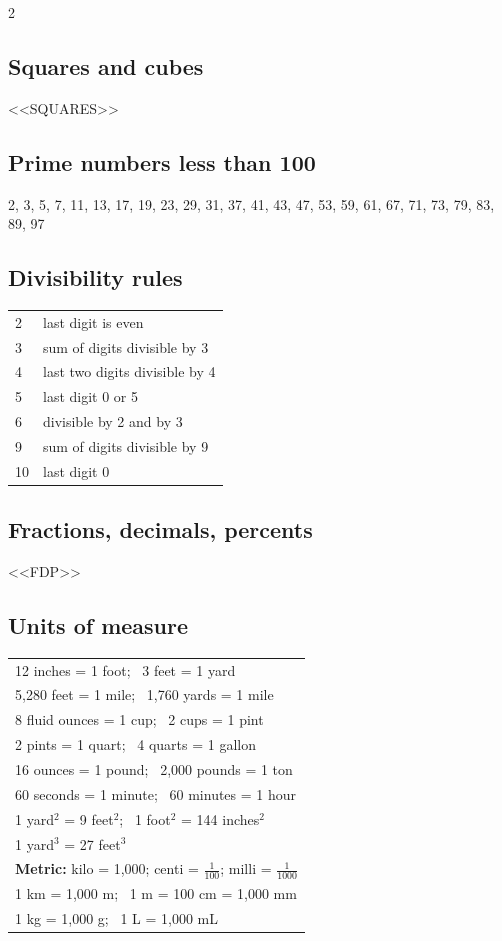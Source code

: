 \begin{multicols}{2}
\subsection*{Squares and cubes}
\begin{center}\small\renewcommand{\arraystretch}{1.1}
<<SQUARES>>
\end{center}

\subsection*{Prime numbers less than 100}
2, 3, 5, 7, 11, 13, 17, 19, 23, 29, 31, 37, 41, 43, 47, 53, 59, 61, 67, 71,
73, 79, 83, 89, 97

\subsection*{Divisibility rules}
\begin{tabular}{@{}ll@{}}
2 & last digit is even\\
3 & sum of digits divisible by 3\\
4 & last two digits divisible by 4\\
5 & last digit 0 or 5\\
6 & divisible by 2 and by 3\\
9 & sum of digits divisible by 9\\
10 & last digit 0
\end{tabular}

\columnbreak
\subsection*{Fractions, decimals, percents}
\begin{center}\small\renewcommand{\arraystretch}{1.15}
<<FDP>>
\end{center}

\subsection*{Units of measure}
\begin{tabular}{@{}l@{}}
12 inches = 1 foot; \ 3 feet = 1 yard\\
5,280 feet = 1 mile; \ 1,760 yards = 1 mile\\
8 fluid ounces = 1 cup; \ 2 cups = 1 pint\\
2 pints = 1 quart; \ 4 quarts = 1 gallon\\
16 ounces = 1 pound; \ 2,000 pounds = 1 ton\\
60 seconds = 1 minute; \ 60 minutes = 1 hour\\
1 yard$^2$ = 9 feet$^2$; \ 1 foot$^2$ = 144 inches$^2$\\
1 yard$^3$ = 27 feet$^3$\\[3pt]
\textbf{Metric:} kilo = 1,000; centi = $\frac{1}{100}$; milli = $\frac{1}{1000}$\\
1 km = 1,000 m; \ 1 m = 100 cm = 1,000 mm\\
1 kg = 1,000 g; \ 1 L = 1,000 mL
\end{tabular}


\end{multicols}
